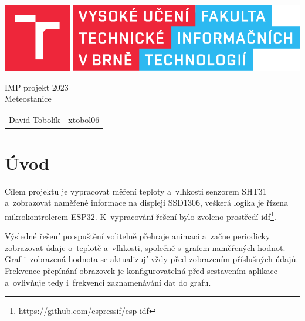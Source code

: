 \documentclass[a4paper, 12pt]{article}
\begin{document}
\begin{titlepage}
	\centering

	\includegraphics{src/fitlogo.pdf}


	{\Huge IMP projekt 2023\\[0.4em]
		\LARGE Meteostanice}


	\begin{table}[H]
		\hfill
		\begin{tabularx}{0.3\textwidth}{Xr}
			David Tobolík & xtobol06 \\
		\end{tabularx}
	\end{table}
\end{titlepage}

\tableofcontents
\newpage

\section{Úvod}
Cílem projektu je vypracovat měření teploty a~vlhkosti senzorem SHT31 a~zobrazovat naměřené informace na displeji SSD1306, veškerá logika je řízena mikrokontrolerem ESP32. K~vypracování řešení bylo zvoleno prostředí idf\footnote{\url{https://github.com/espressif/esp-idf}}.

Výsledné řešení po spuštění volitelně přehraje animaci a~začne periodicky zobrazovat údaje o~teplotě a~vlhkosti, společně s~grafem naměřených hodnot. Graf i~zobrazená hodnota se aktualizují vždy před zobrazením příslušných údajů. Frekvence přepínání obrazovek je konfigurovatelná před sestavením aplikace a~ovlivňuje tedy i~frekvenci zaznamenávání dat do grafu.
\end{document}
